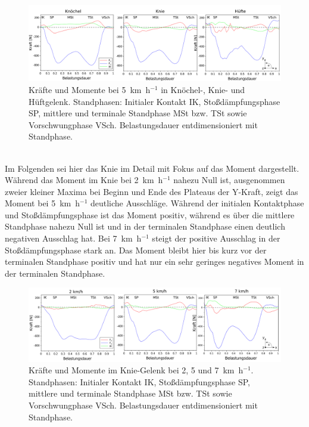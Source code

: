 \begin{figure}[h!]
	\centering
	\includegraphics[width=\linewidth]{bilder/Ergebnisse/ang_inv_kin}
	\caption{Kräfte und Momente bei 5~km~h$^{-1}$ in Knöchel-, Knie- und Hüftgelenk. Standphasen: Initialer Kontakt IK, Stoßdämpfungsphase SP, mittlere und terminale Standphase MSt bzw. TSt sowie Vorschwungphase VSch. Belastungsdauer entdimensioniert mit Standphase.}
	\label{fig:ang_inv_kin}
\end{figure}\\
Im Folgenden sei hier das Knie im Detail mit Fokus auf das Moment dargestellt. Während das Moment im Knie bei 2~km~h$^{-1}$ nahezu Null ist, ausgenommen zweier kleiner Maxima bei Beginn und Ende des Plateaus der Y-Kraft, zeigt das Moment bei 5~km~h$^{-1}$ deutliche Ausschläge. Während der initialen Kontaktphase und Stoßdämpfungsphase ist das Moment positiv, während es über die mittlere Standphase nahezu Null ist und in der terminalen Standphase einen deutlich negativen Ausschlag hat. Bei 7~km~h$^{-1}$ steigt der positive Ausschlag in der Stoßdämpfungsphase stark an. Das Moment bleibt hier bis kurz vor der terminalen Standphase positiv und hat nur ein sehr geringes negatives Moment in der terminalen Standphase.\\
\begin{figure}[h!]
	\centering
	\includegraphics[width=\linewidth]{bilder/Ergebnisse/comp_knee_mom}
	\caption{Kräfte und Momente im Knie-Gelenk bei 2, 5 und 7~km~h$^{-1}$. Standphasen: Initialer Kontakt IK, Stoßdämpfungsphase SP, mittlere und terminale Standphase MSt bzw. TSt sowie Vorschwungphase VSch. Belastungsdauer entdimensioniert mit Standphase.}
	\label{fig:comp_knee_mom}
\end{figure}
\newpage
